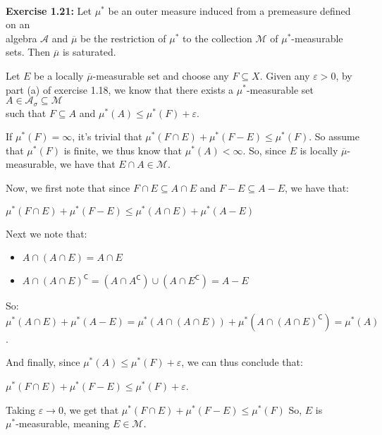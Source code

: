 \documentclass{book}
\newcommand{\exTwoP}{%
   \color{RedViolet}%
   \fontsize{13}{15}\selectfont%
}
\newenvironment{myIndent}{%
   \begin{adjustwidth}{2.5em}{0em}%
}{%
   \end{adjustwidth}%
}
\newcommand{\blab}[1]{\textbf{#1}}
\newcommand{\comp}{\mathsf{C}}
\newcommand{\mySepTwo}[1][.]{%
   {\noindent\color{#1}{\rule{6.5in}{0.5mm}}}\\%
}
\newcommand{\retTwo}{\hfill\bigbreak}
\begin{document}
\mySepTwo

\blab{Exercise 1.21:} Let $\mu^*$ be an outer measure induced from a premeasure defined on an\\ algebra $\mathcal{A}$ and $\overline{\mu}$ be the restriction of $\mu^*$ to the collection $\mathcal{M}$ of $\mu^*$-measurable sets. Then $\overline{\mu}$ is saturated.\\ [-9pt]


\begin{myIndent}\exTwoP
   Let $E$ be a locally $\overline{\mu}$-measurable set and choose any $F \subseteq X$. Given any $\varepsilon > 0$, by part (a) of exercise 1.18, we know that there exists a $\mu^*$-measurable set $A \in \mathcal{A}_{\sigma} \subseteq \mathcal{M}$\\ such that $F \subseteq A$ and $\mu^*(A) \leq \mu^*(F) + \varepsilon$.\retTwo

   If $\mu^*(F) = \infty$, it's trivial that $\mu^*(F \cap E) + \mu^*(F - E) \leq \mu^*(F)$. So assume  that $\mu^*(F)$ is finite, we thus know that $\mu^*(A) < \infty$. So, since $E$ is locally $\overline{\mu}$-measurable, we have that $E \cap A \in \mathcal{M}$.\retTwo

   Now, we first note that since $F \cap E \subseteq A \cap E$ and $F - E \subseteq A - E$, we have that:

   {\centering $\mu^*(F \cap E) + \mu^*(F - E) \leq \mu^*(A \cap E) + \mu^*(A - E) $\retTwo\par}

   Next we note that: 
   \begin{itemize}
      \item $A \cap (A \cap E) = A \cap E$
      \item $A \cap (A \cap E)^\comp = (A \cap A^\comp) \cup (A \cap E^\comp) = A - E$\retTwo
   \end{itemize}

   So: $\mu^*(A \cap E) + \mu^*(A - E) = \mu^*(A \cap (A \cap E)) + \mu^*(A \cap (A \cap E)^\comp) = \mu^*(A)$.\retTwo

   And finally, since $\mu^*(A) \leq \mu^*(F) + \varepsilon$, we can thus conclude that:
   
   {\centering$\mu^*(F \cap E) + \mu^*(F - E) \leq \mu^*(F) + \varepsilon$.\retTwo\par}

   Taking $\varepsilon \rightarrow 0$, we get that $\mu^*(F \cap E) + \mu^*(F - E) \leq \mu^*(F)$ So, $E$ is\\ $\mu^*$-measurable, meaning $E \in \mathcal{M}$.
\end{myIndent}
\end{document}
